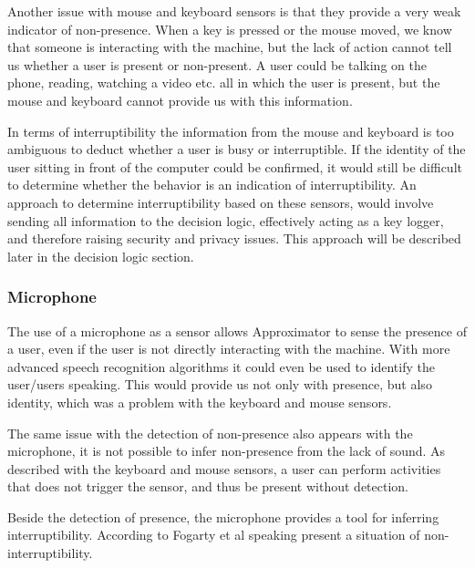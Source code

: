 \documentclass{sigchi}
\begin{document}
Another issue with mouse and keyboard sensors is that they provide a very weak indicator of non-presence.
When a key is pressed or the mouse moved, we know that someone is interacting with the machine, but the lack of action cannot tell us whether a user is present or non-present.
A user could be talking on the phone, reading, watching a video etc. all in which the user is present, but the mouse and keyboard cannot provide us with this information.

In terms of interruptibility the information from the mouse and keyboard is too ambiguous to deduct whether a user is busy or interruptible.
If the identity of the user sitting in front of the computer could be confirmed, it would still be difficult to determine whether the behavior is an indication of interruptibility.
An approach to determine interruptibility based on these sensors, would involve sending all information to the decision logic, effectively acting as a key logger, and therefore raising security and privacy issues.
This approach will be described later in the decision logic section.

\subsubsection{Microphone}
The use of a microphone as a sensor allows Approximator to sense the presence of a user, even if the user is not directly interacting with the machine.
With more advanced speech recognition algorithms it could even be used to identify the user/users speaking.
This would provide us not only with presence, but also identity, which was a problem with the keyboard and mouse sensors.

The same issue with the detection of non-presence also appears with the microphone, it is not possible to infer non-presence from the lack of sound.
As described with the keyboard and mouse sensors, a user can perform activities that does not trigger the sensor, and thus be present without detection.

Beside the detection of presence, the microphone provides a tool for inferring interruptibility.
According to Fogarty et al\cite{fogarty2005predicting} speaking present a situation of non-interruptibility.
\end{document}
